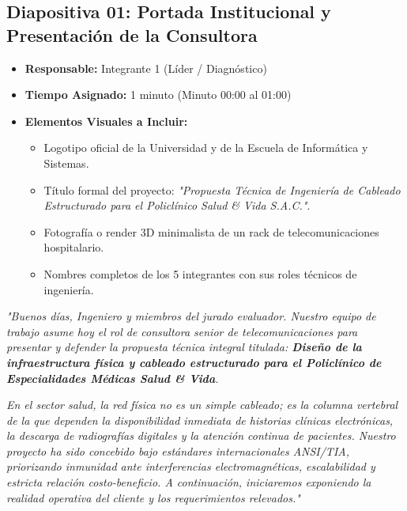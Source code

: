 \documentclass[11pt,a4paper]{article}
\begin{document}
\subsection{Diapositiva 01: Portada Institucional y Presentación de la Consultora}
\begin{itemize}[leftmargin=*]
    \item \textbf{Responsable:} Integrante 1 (Líder / Diagnóstico)
    \item \textbf{Tiempo Asignado:} 1 minuto (Minuto 00:00 al 01:00)
    \item \textbf{Elementos Visuales a Incluir:}
    \begin{itemize}
        \item Logotipo oficial de la Universidad y de la Escuela de Informática y Sistemas.
        \item Título formal del proyecto: \textit{"Propuesta Técnica de Ingeniería de Cableado Estructurado para el Policlínico Salud \& Vida S.A.C."}.
        \item Fotografía o render 3D minimalista de un rack de telecomunicaciones hospitalario.
        \item Nombres completos de los 5 integrantes con sus roles técnicos de ingeniería.
    \end{itemize}
\end{itemize}

\begin{tcolorbox}[colback=white,colframe=primaryblue,title=\textbf{Speech Verbal del Integrante 1 (Guion Palabra por Palabra)}]
\textit{"Buenos días, Ingeniero y miembros del jurado evaluador. Nuestro equipo de trabajo asume hoy el rol de consultora senior de telecomunicaciones para presentar y defender la propuesta técnica integral titulada: \textbf{Diseño de la infraestructura física y cableado estructurado para el Policlínico de Especialidades Médicas Salud \& Vida}.}\par\vspace{2mm}
\textit{En el sector salud, la red física no es un simple cableado; es la columna vertebral de la que dependen la disponibilidad inmediata de historias clínicas electrónicas, la descarga de radiografías digitales y la atención continua de pacientes. Nuestro proyecto ha sido concebido bajo estándares internacionales ANSI/TIA, priorizando inmunidad ante interferencias electromagnéticas, escalabilidad y estricta relación costo-beneficio. A continuación, iniciaremos exponiendo la realidad operativa del cliente y los requerimientos relevados."}
\end{tcolorbox}
\end{document}
